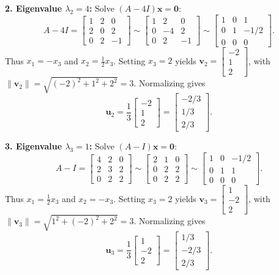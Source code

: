 \documentclass[11pt, letterpaper]{article}
\theoremstyle{definition}
\theoremstyle{remark}
\begin{document}
\textbf{2. Eigenvalue $\lambda_2 = 4$:}
Solve $(A - 4I)\mathbf{x} = \mathbf{0}$:
\[
A - 4I = \begin{bmatrix} 1 & 2 & 0 \\ 2 & 0 & 2 \\ 0 & 2 & -1 \end{bmatrix} \sim \begin{bmatrix} 1 & 2 & 0 \\ 0 & -4 & 2 \\ 0 & 2 & -1 \end{bmatrix} \sim \begin{bmatrix} 1 & 0 & 1 \\ 0 & 1 & -1/2 \\ 0 & 0 & 0 \end{bmatrix}.
\]
Thus $x_1 = -x_3$ and $x_2 = \frac{1}{2}x_3$. Setting $x_3 = 2$ yields $\mathbf{v}_2 = \begin{bmatrix} -2 \\ 1 \\ 2 \end{bmatrix}$, with $\|\mathbf{v}_2\| = \sqrt{(-2)^2 + 1^2 + 2^2} = 3$. Normalizing gives
\[
\mathbf{u}_2 = \frac{1}{3}\begin{bmatrix} -2 \\ 1 \\ 2 \end{bmatrix} = \begin{bmatrix} -2/3 \\ 1/3 \\ 2/3 \end{bmatrix}.
\]

\textbf{3. Eigenvalue $\lambda_3 = 1$:}
Solve $(A - I)\mathbf{x} = \mathbf{0}$:
\[
A - I = \begin{bmatrix} 4 & 2 & 0 \\ 2 & 3 & 2 \\ 0 & 2 & 2 \end{bmatrix} \sim \begin{bmatrix} 2 & 1 & 0 \\ 0 & 2 & 2 \\ 0 & 2 & 2 \end{bmatrix} \sim \begin{bmatrix} 1 & 0 & -1/2 \\ 0 & 1 & 1 \\ 0 & 0 & 0 \end{bmatrix}.
\]
Thus $x_1 = \frac{1}{2}x_3$ and $x_2 = -x_3$. Setting $x_3 = 2$ yields $\mathbf{v}_3 = \begin{bmatrix} 1 \\ -2 \\ 2 \end{bmatrix}$, with $\|\mathbf{v}_3\| = \sqrt{1^2 + (-2)^2 + 2^2} = 3$. Normalizing gives
\[
\mathbf{u}_3 = \frac{1}{3}\begin{bmatrix} 1 \\ -2 \\ 2 \end{bmatrix} = \begin{bmatrix} 1/3 \\ -2/3 \\ 2/3 \end{bmatrix}.
\]
\end{document}
